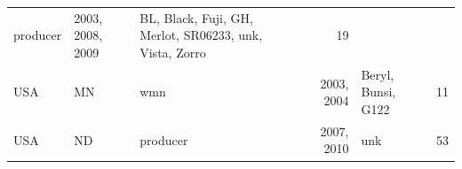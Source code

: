 \documentclass[fleqn,10pt,lineno]{wlpeerj} %
\theoremstyle{definition}
\theoremstyle{definition}
\theoremstyle{definition}
\theoremstyle{remark}
\begin{document}
\begin{longtable}[]{@{}lllrlr@{}}
\begin{minipage}[t]{0.12\columnwidth}
producer\strut
\end{minipage} & \begin{minipage}[t]{0.19\columnwidth}\raggedleft\strut
2003, 2008, 2009\strut
\end{minipage} & \begin{minipage}[t]{0.29\columnwidth}\raggedright\strut
BL, Black, Fuji, GH, Merlot, SR06233, unk, Vista, Zorro\strut
\end{minipage} & \begin{minipage}[t]{0.04\columnwidth}\raggedleft\strut
19\strut
\end{minipage}\tabularnewline
\begin{minipage}[t]{0.11\columnwidth}\raggedright\strut
USA\strut
\end{minipage} & \begin{minipage}[t]{0.08\columnwidth}\raggedright\strut
MN\strut
\end{minipage} & \begin{minipage}[t]{0.12\columnwidth}\raggedright\strut
wmn\strut
\end{minipage} & \begin{minipage}[t]{0.19\columnwidth}\raggedleft\strut
2003, 2004\strut
\end{minipage} & \begin{minipage}[t]{0.29\columnwidth}\raggedright\strut
Beryl, Bunsi, G122\strut
\end{minipage} & \begin{minipage}[t]{0.04\columnwidth}\raggedleft\strut
11\strut
\end{minipage}\tabularnewline
\begin{minipage}[t]{0.11\columnwidth}\raggedright\strut
USA\strut
\end{minipage} & \begin{minipage}[t]{0.08\columnwidth}\raggedright\strut
ND\strut
\end{minipage} & \begin{minipage}[t]{0.12\columnwidth}\raggedright\strut
producer\strut
\end{minipage} & \begin{minipage}[t]{0.19\columnwidth}\raggedleft\strut
2007, 2010\strut
\end{minipage} & \begin{minipage}[t]{0.29\columnwidth}\raggedright\strut
unk\strut
\end{minipage} & \begin{minipage}[t]{0.04\columnwidth}\raggedleft\strut
53\strut
\end{minipage}\tabularnewline

\end{longtable}
\end{document}
